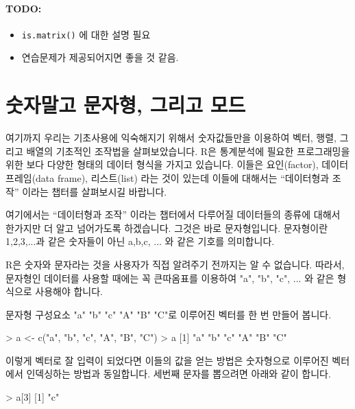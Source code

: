 \documentclass[tutorial.tex]{subfiles}
\begin{document}
\paragraph{TODO:}
\begin{itemize}
	\item \texttt{is.matrix()} 에 대한 설명 필요
	\item 연습문제가 제공되어지면 좋을 것 같음. 
\end{itemize}

%
%
%

\section{숫자말고 문자형, 그리고 모드}

여기까지 우리는 기초사용에 익숙해지기 위해서 숫자값들만을 이용하여 벡터, 행렬, 그리고 배열의 기초적인 조작법을 살펴보았습니다. 
R은 통계분석에 필요한 프로그래밍을 위한 보다 다양한 형태의 데이터 형식을 가지고 있습니다.
이들은 요인(factor), 데이터 프레임(data frame), 리스트(list) 라는 것이 있는데 이들에 대해서는 ``데이터형과 조작'' 이라는 챕터를 살펴보시길 바랍니다. 

여기에서는 ``데이터형과 조작'' 이라는 챕터에서 다루어질 데이터들의 종류에 대해서 한가지만 더 알고 넘어가도록 하겠습니다.
그것은 바로 문자형입니다. 
문자형이란 1,2,3,...과 같은 숫자들이 아닌 a,b,c, ... 와 같은 기호를 의미합니다.

R은 숫자와 문자라는 것을 사용자가 직접 알려주기 전까지는 알 수 없습니다. 
따라서, 문자형인 데이터를 사용할 때에는 꼭 큰따옴표를 이용하여 "a", "b", "c", ... 와 같은 형식으로 사용해야 합니다. 

문자형 구성요소 "a" "b" "c" "A" "B" "C"로 이루어진 벡터를 한 번 만들어 봅니다.

\begin{Schunk}
\begin{Soutput}
> a <- c("a", "b", "c", "A", "B", "C")
> a
[1] "a" "b" "c" "A" "B" "C"
\end{Soutput}
\end{Schunk}

이렇게 벡터로 잘 입력이 되었다면 이들의 값을 얻는 방법은 숫자형으로 이루어진 벡터에서 인덱싱하는 방법과 동일합니다. 
세번째 문자를 뽑으려면 아래와 같이 합니다. 

\begin{Schunk}
\begin{Soutput}
> a[3]
[1] "c"
\end{Soutput}
\end{Schunk}
\end{document}
